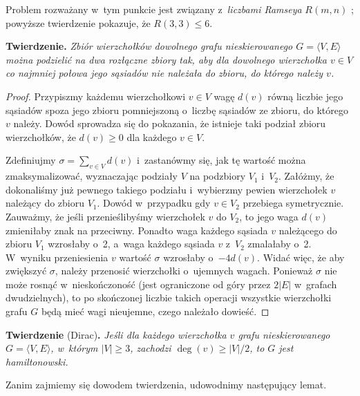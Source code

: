 Problem rozważany w~tym punkcie jest związany z~\emph{liczbami Ramseya} $R(m,n)$ \cite{ramseynumber}; powyższe twierdzenie pokazuje, że $R(3,3)\le6$.

\subproblem %
\textsf{\textbf{Twierdzenie.}} \textit{Zbiór wierzchołków dowolnego grafu nieskierowanego\/ $G=\langle V,E\rangle$ można podzielić na dwa rozłączne zbiory tak, aby dla dowolnego wierzchołka\/ $v\in V$ co najmniej połowa jego sąsiadów nie należała do zbioru, do którego należy\/ $v$.}
\begin{proof}
Przypiszmy każdemu wierzchołkowi $v\in V$ wagę $d(v)$ równą liczbie jego sąsiadów spoza jego zbioru pomniejszoną o~liczbę sąsiadów ze zbioru, do którego $v$ należy. Dowód sprowadza się do pokazania, że istnieje taki podział zbioru wierzchołków, że $d(v)\ge0$ dla każdego $v\in V$\!.

Zdefiniujmy $\sigma=\sum_{v\in V}d(v)$ i~zastanówmy się, jak tę wartość można zmaksymalizować, wyznaczając podziały $V$ na podzbiory $V_1$ i~$V_2$. Załóżmy, że dokonaliśmy już pewnego takiego podziału i~wybierzmy pewien wierzchołek $v$ należący do zbioru $V_1$. Dowód w~przypadku gdy $v\in V_2$ przebiega symetrycznie. Zauważmy, że jeśli przenieślibyśmy wierzchołek $v$ do $V_2$, to jego waga $d(v)$ zmieniłaby znak na przeciwny. Ponadto waga każdego sąsiada $v$ należącego do zbioru $V_1$ wzrosłaby o~2, a~waga każdego sąsiada $v$ z~$V_2$ zmalałaby o~2. W~wyniku przeniesienia $v$ wartość $\sigma$ wzrosłaby o~$-4d(v)$. Widać więc, że aby zwiększyć $\sigma$, należy przenosić wierzchołki o~ujemnych wagach. Ponieważ $\sigma$ nie może rosnąć w~nieskończoność (jest ograniczone od góry przez $2|E|$ w~grafach dwudzielnych), to po skończonej liczbie takich operacji wszystkie wierzchołki grafu $G$ będą mieć wagi nieujemne, czego należało dowieść.
\end{proof}

\subproblem %
\textsf{\textbf{Twierdzenie} (Dirac)\textbf{.}} \textit{Jeśli dla każdego wierzchołka\/ $v$ grafu nieskierowanego\/ $G=\langle V,E\rangle$, w~którym\/ $|V|\ge3$, zachodzi\/ $\deg(v)\ge|V|/2$, to\/ $G$ jest hamiltonowski.}

\medskip
\noindent Zanim zajmiemy się dowodem twierdzenia, udowodnimy następujący lemat.


